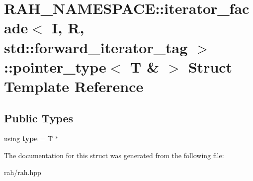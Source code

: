 \hypertarget{struct_r_a_h___n_a_m_e_s_p_a_c_e_1_1iterator__facade_3_01_i_00_01_r_00_01std_1_1forward__iteratoea928274de843ca75854fe11c7a3d72e}{}\section{R\+A\+H\+\_\+\+N\+A\+M\+E\+S\+P\+A\+CE\+::iterator\+\_\+facade$<$ I, R, std\+::forward\+\_\+iterator\+\_\+tag $>$\+::pointer\+\_\+type$<$ T \& $>$ Struct Template Reference}
\label{struct_r_a_h___n_a_m_e_s_p_a_c_e_1_1iterator__facade_3_01_i_00_01_r_00_01std_1_1forward__iteratoea928274de843ca75854fe11c7a3d72e}
\subsection*{Public Types}
\begin{DoxyCompactItemize}
\item 
\mbox{\label{struct_r_a_h___n_a_m_e_s_p_a_c_e_1_1iterator__facade_3_01_i_00_01_r_00_01std_1_1forward__iteratoea928274de843ca75854fe11c7a3d72e_ae22b60421f07225c791125987b870d8f}} 
using {\bfseries type} = T $\ast$
\end{DoxyCompactItemize}


The documentation for this struct was generated from the following file\+:\begin{DoxyCompactItemize}
\item 
rah/rah.\+hpp\end{DoxyCompactItemize}
